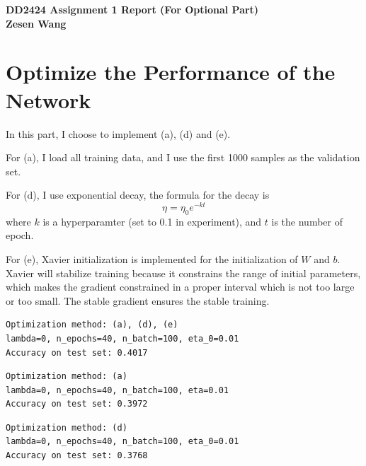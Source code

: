 

\usepackage{tikz}
\usepackage{graphicx}
\usepackage{amssymb}
\usepackage{amsmath}
\usepackage{harpoon}
\usepackage{float}
\usepackage{enumerate}
\usepackage{algorithm}
\usepackage{algpseudocode}
\usepackage{subcaption}
\usepackage{bm}
\usepackage{listings}


\usetikzlibrary{fit,positioning}


\begin{flushleft}

\bf{DD2424 Assignment 1 Report (For Optional Part)} \\
\bf{Zesen Wang} \\


\end{flushleft}



\section{Optimize the Performance of the Network}

In this part, I choose to implement (a), (d) and (e).

For (a), I load all training data, and I use the first 1000 samples as the validation set.

For (d), I use exponential decay, the formula for the decay is 
\[
	\eta = \eta_0 e^{-kt}
\]
where $k$ is a hyperparamter (set to 0.1 in experiment), and $t$ is the number of epoch.

For (e), Xavier initialization is implemented for the initialization of $W$ and $b$. Xavier will stabilize training because it constrains the range of initial parameters, which makes the gradient constrained in a proper interval which is not too large or too small. The stable gradient ensures the stable training.

\begin{verbatim}
Optimization method: (a), (d), (e)
lambda=0, n_epochs=40, n_batch=100, eta_0=0.01
Accuracy on test set: 0.4017
\end{verbatim}

\begin{verbatim}
Optimization method: (a)
lambda=0, n_epochs=40, n_batch=100, eta=0.01
Accuracy on test set: 0.3972
\end{verbatim}

\begin{verbatim}
Optimization method: (d)
lambda=0, n_epochs=40, n_batch=100, eta_0=0.01
Accuracy on test set: 0.3768
\end{verbatim}

